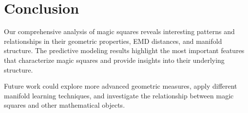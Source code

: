 \documentclass[11pt,a4paper]{article}
\begin{document}
\section{Conclusion}

Our comprehensive analysis of magic squares reveals interesting patterns and relationships in their geometric properties, 
EMD distances, and manifold structure. The predictive modeling results highlight the most important features that 
characterize magic squares and provide insights into their underlying structure.

Future work could explore more advanced geometric measures, apply different manifold learning techniques, 
and investigate the relationship between magic squares and other mathematical objects.
\end{document}

